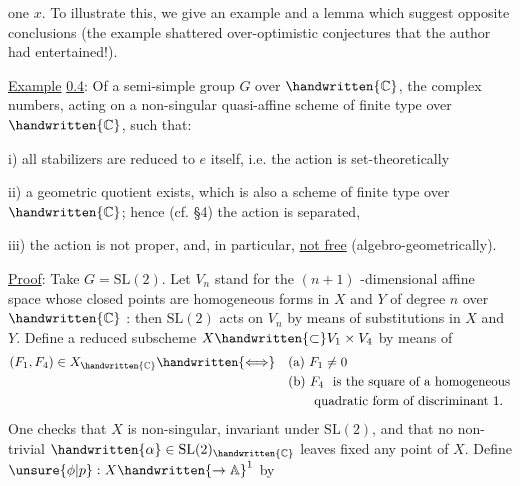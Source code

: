 
one $x$. To illustrate this, we give an example and a lemma which suggest opposite conclusions (the example shattered over-optimistic conjectures that the author had entertained!).

\uline{Example} \uline{0.4}: Of a semi-simple group $G$ over $\handwritten{\mathbb C}$, the complex numbers, acting on a non-singular quasi-affine scheme of finite type over $\handwritten{\mathbb C}$, such that:

i) all stabilizers are reduced to $e$ itself, i.e. the action is set-theoretically 

ii) a geometric quotient exists, which is also a scheme of finite type over $\handwritten{\mathbb C}$; hence (cf. \S4) the action is separated,

\margin{\handwritten{\unsure{$\sim$!|!}}}
iii) the action is not proper, and, in particular, \uline{not free} (algebro-geometrically).

\uline{Proof}: Take $G=\mathrm{SL}(2)$. Let $V_n$ stand for the $(n+1)$ -dimensional affine space whose closed points are homogeneous forms in $X$ and $Y$ of degree $n$ over $\handwritten{\mathbb C}$ : then $\mathrm{SL}(2)$ acts on $V_n$ by means of substitutions in $X$ and $Y$. Define a reduced subscheme $X\handwritten{\subset}V_1\times V_4$ by means of
\[
\begin{aligned}
(F_1,F_4)\in X_{\handwritten{\mathbb C}}\handwritten{\Longleftrightarrow} &\quad\text{(a) }F_1\ne 0\\
 &\quad\text{(b) }F_4\ \text{ is the square of a homogeneous}\\
 &\qquad\quad\text{quadratic form of discriminant 1.}
\end{aligned}
\]
One checks that $X$ is non-singular, invariant under $\mathrm{SL}(2)$, and that no non-trivial $\handwritten{\alpha}\in\mathrm{SL}(2)_{\handwritten{\mathbb C}}$ leaves fixed any point of $X$. Define $\unsure{\phi|p}:X\handwritten{\to\mathbb A}^{1}$ by

